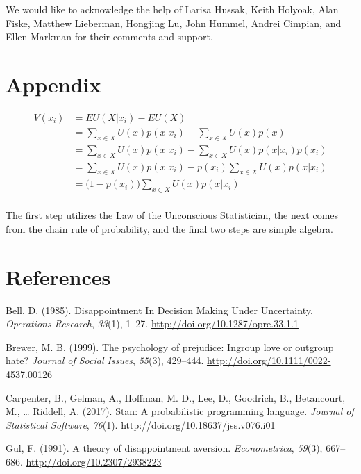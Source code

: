 \documentclass[12pt,]{article}
\begin{document}
We would like to acknowledge the help of Larisa Hussak, Keith Holyoak,
Alan Fiske, Matthew Lieberman, Hongjing Lu, John Hummel, Andrei Cimpian,
and Ellen Markman for their comments and support.

\section{Appendix}\label{appendix}

\[ \begin{aligned}
V(x_i) &= EU(X|x_i) - EU(X) \\
&=  \sum_{x \in X} U(x)p(x|x_i) - \sum_{x \in X} U(x)p(x) \\
&= \sum_{x \in X} U(x)p(x|x_i) - \sum_{x \in X} U(x)p(x|x_i)p(x_i) \\
&= \sum_{x \in X} U(x)p(x|x_i) - p(x_i)\sum_{x \in X} U(x)p(x|x_i) \\
&= \big(1 - p(x_i) \big) \sum_{x \in X} U(x)p(x|x_i) \\
\end{aligned}\]

The first step utilizes the Law of the Unconscious Statistician, the
next comes from the chain rule of probability, and the final two steps
are simple algebra.

\section{References}\label{references}

\setlength{\parindent}{-0.125in} \setlength{\leftskip}{0.125in}
\noindent

\hypertarget{refs}{}
\hypertarget{ref-Bell1985}{}
Bell, D. (1985). Disappointment In Decision Making Under Uncertainty.
\emph{Operations Research}, \emph{33}(1), 1--27.
\url{http://doi.org/10.1287/opre.33.1.1}

\hypertarget{ref-Brewer1999}{}
Brewer, M. B. (1999). The psychology of prejudice: Ingroup love or
outgroup hate? \emph{Journal of Social Issues}, \emph{55}(3), 429--444.
\url{http://doi.org/10.1111/0022-4537.00126}

\hypertarget{ref-Carpenter2017}{}
Carpenter, B., Gelman, A., Hoffman, M. D., Lee, D., Goodrich, B.,
Betancourt, M., \ldots{} Riddell, A. (2017). Stan: A probabilistic
programming language. \emph{Journal of Statistical Software},
\emph{76}(1). \url{http://doi.org/10.18637/jss.v076.i01}

\hypertarget{ref-Gul1991}{}
Gul, F. (1991). A theory of disappointment aversion.
\emph{Econometrica}, \emph{59}(3), 667--686.
\url{http://doi.org/10.2307/2938223}
\end{document}

